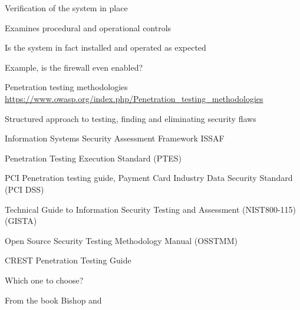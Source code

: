 \documentclass[Screen16to9,17pt]{foils}
\begin{document}






\begin{list1}
\item Verification of the system in place
\item Examines procedural and operational controls
\item Is the system in fact installed and operated as expected
\item Example, is the firewall even enabled?
\item Penetration testing methodologies\\
\url{https://www.owasp.org/index.php/Penetration_testing_methodologies}
\end{list1}






\begin{list2}
\item Structured approach to testing, finding and eliminating security flaws
\item Information Systems Security Assessment Framework ISSAF
\item Penetration Testing Execution Standard (PTES)
\item PCI Penetration testing guide, Payment Card Industry Data Security Standard (PCI DSS)
\item Technical Guide to Information Security Testing and Assessment (NIST800-115) (GISTA)
\item Open Source Security Testing Methodology Manual (OSSTMM)
\item CREST Penetration Testing Guide
\end{list2}

Which one to choose?

From the book Bishop and 




\end{document}
